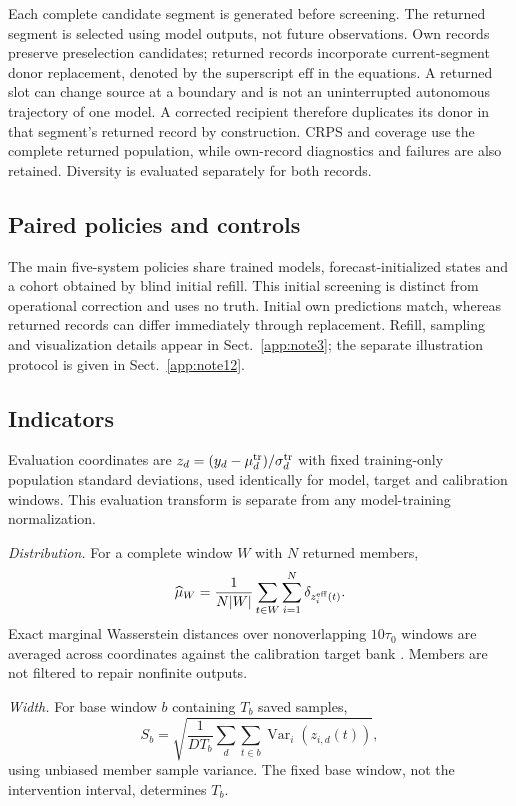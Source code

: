 \documentclass[gmd,manuscript]{copernicus}
\begin{document}
Each complete candidate segment is generated before screening. The returned segment is selected using model outputs, not future observations. Own records preserve preselection candidates; returned records incorporate current-segment donor replacement, denoted by the superscript $\mathrm{eff}$ in the equations. A returned slot can change source at a boundary and is not an uninterrupted autonomous trajectory of one model. A corrected recipient therefore duplicates its donor in that segment's returned record by construction. CRPS and coverage use the complete returned population, while own-record diagnostics and failures are also retained. Diversity is evaluated separately for both records.

\subsection{Paired policies and controls}
The main five-system policies share trained models, forecast-initialized states and a cohort obtained by blind initial refill. This initial screening is distinct from operational correction and uses no truth. Initial own predictions match, whereas returned records can differ immediately through replacement. Refill, sampling and visualization details appear in Sect.~\ref{app:note3}; the separate illustration protocol is given in Sect.~\ref{app:note12}.

\subsection{Indicators}
Evaluation coordinates are $z_d=(y_d-\mu_d^{\rm tr})/\sigma_d^{\rm tr}$ with fixed training-only population standard deviations, used identically for model, target and calibration windows. This evaluation transform is separate from any model-training normalization. 

\emph{Distribution.} For a complete window $W$ with $N$ returned members,
\begin{equation}
\widehat\mu_W=\frac{1}{N|W|}\sum_{t\in W}\sum_{i=1}^N\delta_{z_i^{\rm eff}(t)}.
\end{equation}
Exact marginal Wasserstein distances over nonoverlapping $10\tau_0$ windows are averaged across coordinates against the calibration target bank \citep{vissio2020evaluating}. Members are not filtered to repair nonfinite outputs.

\emph{Width.} For base window $b$ containing $T_b$ saved samples,
\begin{equation}
S_b=\sqrt{\frac{1}{DT_b}\sum_d\sum_{t\in b}\operatorname{Var}_{i}(z_{i,d}(t))},
\end{equation}
using unbiased member sample variance. The fixed base window, not the intervention interval, determines $T_b$.
\end{document}
